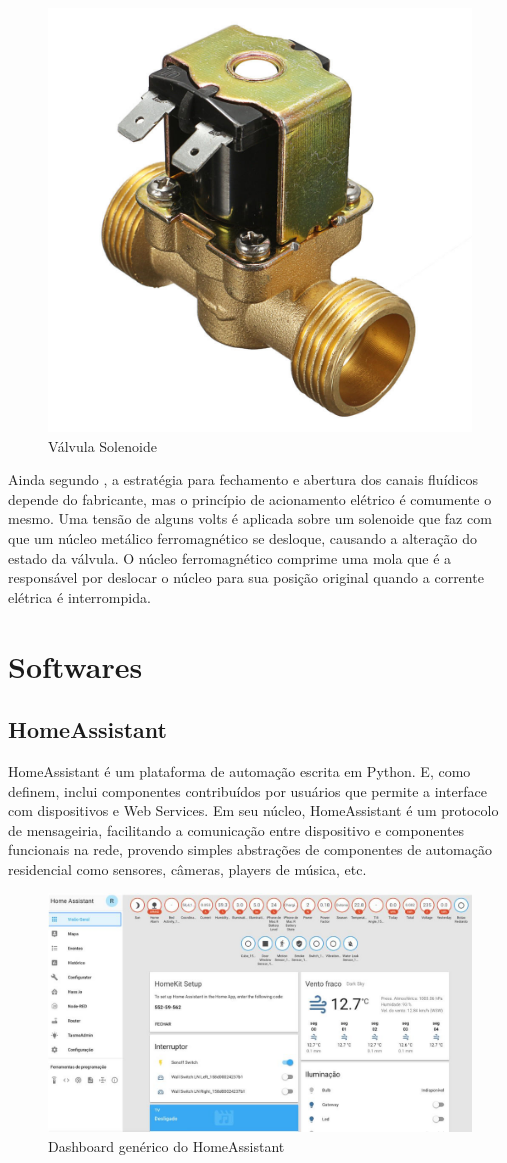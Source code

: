 \begin{figure}[htbp]
	\centering
	\includegraphics[width=0.3\linewidth]{figuras/valvula-solenoide.jpg}
	\caption{Válvula Solenoide}
	\label{valvula-solenoide}
\end{figure}

Ainda segundo \cite{da2002modulo}, a estratégia para fechamento e abertura dos canais fluídicos depende do fabricante, mas o princípio de acionamento elétrico é comumente o mesmo. Uma tensão de alguns volts é aplicada sobre um solenoide que faz com que um núcleo metálico ferromagnético se desloque, causando a alteração do estado da válvula. O núcleo
ferromagnético comprime uma mola que é a responsável por deslocar o núcleo para sua posição original quando a corrente elétrica é interrompida.

\section{Softwares}

\subsection{HomeAssistant}

HomeAssistant é um plataforma de automação escrita em Python. E, como \cite{Lundrigan2017} definem, inclui componentes contribuídos por usuários que permite a interface com dispositivos e Web Services. Em seu núcleo, HomeAssistant é um protocolo de mensageiria, facilitando a comunicação entre dispositivo e componentes funcionais na rede, provendo simples abstrações de componentes de automação residencial como sensores, câmeras, players de música, etc.

\begin{figure}[htbp]
	\centering
	\includegraphics[width=1\linewidth]{figuras/homeassistant-dash.png}
	\caption{Dashboard genérico do HomeAssistant}
	\label{fig:homeassistant-dash}
\end{figure}


